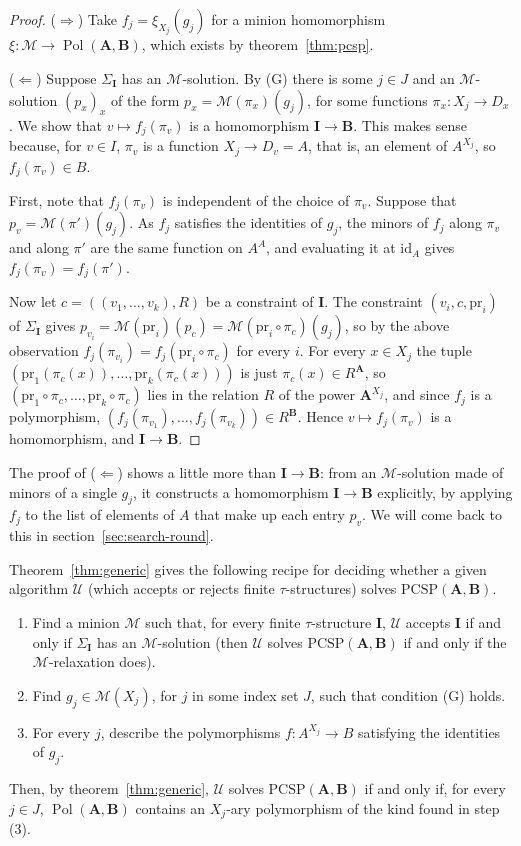 \documentclass[11pt]{article}
\theoremstyle{plain}
\theoremstyle{definition}
\newcommand{\Pol}{\operatorname{Pol}}
\newcommand{\pr}{\mathrm{pr}}
\newcommand{\id}{\mathrm{id}}
\newcommand{\bA}{\mathbf{A}}
\newcommand{\bB}{\mathbf{B}}
\newcommand{\bI}{\mathbf{I}}
\newcommand{\M}{\mathscr{M}}
\newcommand{\PCSP}{\mathrm{PCSP}}
\begin{document}
\begin{proof}
($\Rightarrow$) Take $f_j=\xi_{X_j}(g_j)$ for a minion homomorphism $\xi\colon\M\to\Pol(\bA,\bB)$, which exists by theorem~\ref{thm:pcsp}.

($\Leftarrow$) Suppose $\Sigma_{\bI}$ has an $\M$-solution. By (G) there is some $j \in J$ and an $\M$-solution $(p_x)_x$ of the form $p_x=\M(\pi_x)(g_j)$, for some functions $\pi_x\colon X_j\to D_x$. We show that $v\mapsto f_j(\pi_v)$ is a homomorphism $\bI\to\bB$. This makes sense because, for $v \in I$, $\pi_v$ is a function $X_j\to D_v=A$, that is, an element of $A^{X_j}$, so $f_j(\pi_v)\in B$.

First, note that $f_j(\pi_v)$ is independent of the choice of $\pi_v$. Suppose that $p_v=\M(\pi')(g_j)$. As $f_j$ satisfies the identities of $g_j$, the minors of $f_j$ along $\pi_v$ and along $\pi'$ are the same function on $A^A$, and evaluating it at $\id_A$ gives $f_j(\pi_v)=f_j(\pi')$.

Now let $c=((v_1,\dots,v_k),R)$ be a constraint of $\bI$. The constraint $(v_i,c,\pr_i)$ of $\Sigma_{\bI}$ gives $p_{v_i}=\M(\pr_i)(p_c)=\M(\pr_i\circ\pi_c)(g_j)$, so by the above observation $f_j(\pi_{v_i})=f_j(\pr_i\circ\pi_c)$ for every $i$. For every $x\in X_j$ the tuple $(\pr_1(\pi_c(x)),\dots,\pr_k(\pi_c(x)))$ is just $\pi_c(x)\in R^{\bA}$, so $(\pr_1\circ\pi_c,\dots,\pr_k\circ\pi_c)$ lies in the relation $R$ of the power $\bA^{X_j}$, and since $f_j$ is a polymorphism, $(f_j(\pi_{v_1}),\dots,f_j(\pi_{v_k}))\in R^{\bB}$. Hence $v\mapsto f_j(\pi_v)$ is a homomorphism, and $\bI\to\bB$.
\end{proof}

The proof of ($\Leftarrow$) shows a little more than $\bI\to\bB$: from an $\M$-solution made of minors of a single $g_j$, it constructs a homomorphism $\bI\to\bB$ explicitly, by applying $f_j$ to the list of elements of $A$ that make up each entry $p_v$. We will come back to this in section~\ref{sec:search-round}.

Theorem~\ref{thm:generic} gives the following recipe for deciding whether a given algorithm $\mathcal U$ (which accepts or rejects finite $\tau$-structures) solves $\PCSP(\bA,\bB)$.
\begin{enumerate}[label=(\arabic*)]
  \item Find a minion $\M$ such that, for every finite $\tau$-structure $\bI$, $\mathcal U$ accepts $\bI$ if and only if $\Sigma_{\bI}$ has an $\M$-solution (then $\mathcal U$ solves $\PCSP(\bA,\bB)$ if and only if the $\M$-relaxation does).
  \item Find $g_j\in\M(X_j)$, for $j$ in some index set $J$, such that condition (G) holds.
  \item For every $j$, describe the polymorphisms $f\colon A^{X_j}\to B$ satisfying the identities of $g_j$.
\end{enumerate}
Then, by theorem~\ref{thm:generic}, $\mathcal U$ solves $\PCSP(\bA,\bB)$ if and only if, for every $j\in J$, $\Pol(\bA,\bB)$ contains an $X_j$-ary polymorphism of the kind found in step (3).
\end{document}
